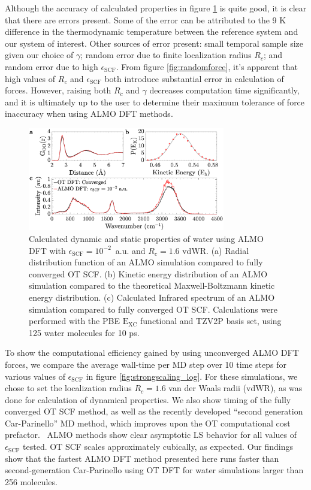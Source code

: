 \documentclass[aps,prl,reprint,amsmath,amssymb]{revtex4-1}
\begin{document}
Although the accuracy of calculated properties in figure \ref{fig:dynproperties} is quite good, it is clear that there are errors present.
Some of the error can be attributed to the 9 K difference in the thermodynamic temperature between the reference system and our system of interest.
Other sources of error present: small temporal sample size given our choice of $\gamma$; random error due to finite localization radius $R_{c}$; and random error due to high $\epsilon_{\text{SCF}}$.
From figure \ref{fig:randomforce}, it's apparent that high values of $R_{c}$ and $\epsilon_{\text{SCF}}$ both introduce substantial error in calculation of forces.
However, raising both $R_{c}$ and $\gamma$ decreases computation time significantly, and it is ultimately up to the user to determine their maximum tolerance of force inaccuracy when using ALMO DFT methods.

\begin{figure}
\includegraphics[trim={1.3cm 0.1cm 3.3cm 1.3cm},clip,width=8.6cm]{Dynamical_Data_Tiled.eps}
\caption{\label{fig:dynproperties} Calculated dynamic and static properties of water using ALMO DFT with $\epsilon_{\text{SCF}} = 10^{-2}$~a.u. and $R_{c} = 1.6$ vdWR.
(a) Radial distribution function of an ALMO simulation compared to fully converged OT SCF. 
(b) Kinetic energy distribution of an ALMO simulation compared to the theoretical Maxwell-Boltzmann kinetic energy distribution.
(c) Calculated Infrared spectrum of an ALMO simulation compared to fully converged OT SCF.
Calculations were performed with the PBE $\mathrm{E_{XC}}$ functional and TZV2P basis set, using 125 water molecules for 10 ps.}
\end{figure}


To show the computational efficiency gained by using unconverged ALMO DFT forces, we compare the average wall-time per MD step over 10 time steps for various values of $\epsilon_{\text{SCF}}$ in figure \ref{fig:strongscaling_log}.
For these simulations, we chose to set the localization radius $R_{c} = 1.6$ van der Waals radii (vdWR), as was done for calculation of dynamical properties.
We also show timing of the fully converged OT SCF method, as well as the recently developed ``second generation Car-Parinello'' MD method, which improves upon the OT computational cost prefactor.~\cite{a:2ndcpmd}
ALMO methods show clear asymptotic LS behavior for all values of $\epsilon_{\text{SCF}}$ tested.
OT SCF scales approximately cubically, as expected.
Our findings show that the fastest ALMO DFT method presented here runs faster than second-generation Car-Parinello using OT DFT for water simulations larger than 256 molecules.
\end{document}
